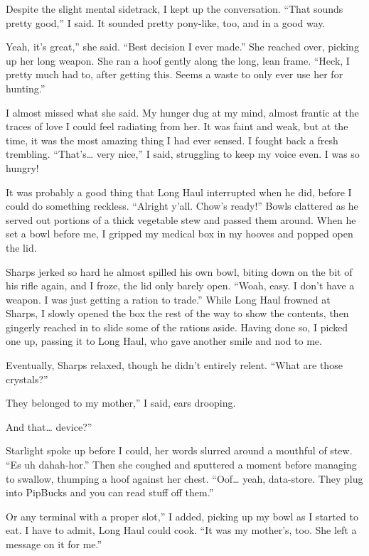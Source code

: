 Despite the slight mental sidetrack, I kept up the conversation. “That sounds pretty good,” I said. It sounded pretty pony-like, too, and in a good way.

\leavevmode{}Yeah, it’s great,” she said. “Best decision I ever made.” She reached over, picking up her long weapon. She ran a hoof gently along the long, lean frame. “Heck, I pretty much had to, after getting this. Seems a waste to only ever use her for hunting.”

I almost missed what she said. My hunger dug at my mind, almost frantic at the traces of love I could feel radiating from her. It was faint and weak, but at the time, it was the most amazing thing I had ever sensed. I fought back a fresh trembling. “That’s… very nice,” I said, struggling to keep my voice even. I was so hungry!

It was probably a good thing that Long Haul interrupted when he did, before I could do something reckless. “Alright y’all. Chow’s ready!” Bowls clattered as he served out portions of a thick vegetable stew and passed them around. When he set a bowl before me, I gripped my medical box in my hooves and popped open the lid.

Sharps jerked so hard he almost spilled his own bowl, biting down on the bit of his rifle again, and I froze, the lid only barely open. “Woah, easy. I don’t have a weapon. I was just getting a ration to trade.” While Long Haul frowned at Sharps, I slowly opened the box the rest of the way to show the contents, then gingerly reached in to slide some of the rations aside. Having done so, I picked one up, passing it to Long Haul, who gave another smile and nod to me.

Eventually, Sharps relaxed, though he didn’t entirely relent. “What are those crystals?”

\leavevmode{}They belonged to my mother,” I said, ears drooping.

\leavevmode{}And that… device?”

Starlight spoke up before I could, her words slurred around a mouthful of stew. “Es uh dahah-hor.” Then she coughed and sputtered a moment before managing to swallow, thumping a hoof against her chest. “Oof… yeah, data-store. They plug into PipBucks and you can read stuff off them.”

\leavevmode{}Or any terminal with a proper slot,” I added, picking up my bowl as I started to eat. I have to admit, Long Haul could cook. “It was my mother’s, too. She left a message on it for me.”

